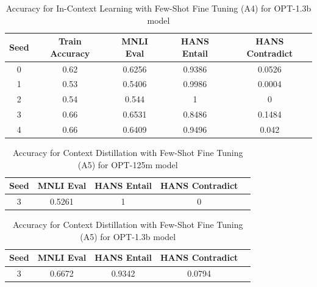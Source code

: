 \documentclass[10pt,twocolumn,letterpaper]{article}
\begin{document}
	\begin{table}[h!]
	\begin{center}
	\begin{tabular}{|c|c|c|c|c|}
	\hline
	\textbf{Seed} & \textbf{Train Accuracy} & \textbf{MNLI Eval} & \textbf{HANS Entail} & \textbf{HANS Contradict} \\
	\hline
	\hline
	0 & 0.62 & 0.6256 & 0.9386 & 0.0526 \\
	1 & 0.53 & 0.5406 & 0.9986 & 0.0004 \\
	2 & 0.54 & 0.544 & 1 & 0 \\
	3 & 0.66 & 0.6531 & 0.8486 & 0.1484 \\
	4 & 0.66 & 0.6409 & 0.9496 & 0.042 \\
	\hline
	\end{tabular}
	\end{center}
	\caption{Accuracy for In-Context Learning with Few-Shot Fine Tuning (A4) for OPT-1.3b model}
	\end{table}
	
				
				
				
				
				
				
	
	\begin{table}[h!]
	\begin{center}
	\begin{tabular}{|c|c|c|c|c|}
	\hline
	\textbf{Seed} & \textbf{MNLI Eval} & \textbf{HANS Entail} & \textbf{HANS Contradict} \\
	\hline
	\hline
	3 & 0.5261 & 1 & 0 \\
	\hline
	\end{tabular}
	\end{center}
	\caption{Accuracy for Context Distillation with Few-Shot Fine Tuning (A5) for OPT-125m model}
	\end{table}
	
	\begin{table}[h!]
	\begin{center}
	\begin{tabular}{|c|c|c|c|c|}
	\hline
	\textbf{Seed} & \textbf{MNLI Eval} & \textbf{HANS Entail} & \textbf{HANS Contradict} \\
	\hline
	\hline
	3 & 0.6672 & 0.9342 & 0.0794 \\
	\hline
	\end{tabular}
	\end{center}
	\caption{Accuracy for Context Distillation with Few-Shot Fine Tuning (A5) for OPT-1.3b model}
	\end{table}
\end{document}
